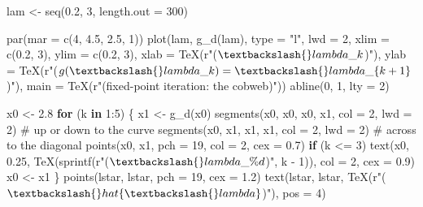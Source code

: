 \documentclass[
  letterpaper,
  DIV=11,
  numbers=noendperiod]{scrreprt}
\newenvironment{Shaded}{\begin{snugshade}}{\end{snugshade}}
\newcommand{\AttributeTok}[1]{\textcolor[rgb]{0.40,0.45,0.13}{#1}}
\newcommand{\CommentTok}[1]{\textcolor[rgb]{0.37,0.37,0.37}{#1}}
\newcommand{\ControlFlowTok}[1]{\textcolor[rgb]{0.00,0.23,0.31}{\textbf{#1}}}
\newcommand{\DecValTok}[1]{\textcolor[rgb]{0.68,0.00,0.00}{#1}}
\newcommand{\FloatTok}[1]{\textcolor[rgb]{0.68,0.00,0.00}{#1}}
\newcommand{\FunctionTok}[1]{\textcolor[rgb]{0.28,0.35,0.67}{#1}}
\newcommand{\NormalTok}[1]{\textcolor[rgb]{0.00,0.23,0.31}{#1}}
\newcommand{\OtherTok}[1]{\textcolor[rgb]{0.00,0.23,0.31}{#1}}
\newcommand{\SpecialCharTok}[1]{\textcolor[rgb]{0.37,0.37,0.37}{#1}}
\newcommand{\StringTok}[1]{\textcolor[rgb]{0.13,0.47,0.30}{#1}}
\begin{document}
\begin{Shaded}
\begin{Highlighting}[]
\NormalTok{lam }\OtherTok{\textless{}{-}} \FunctionTok{seq}\NormalTok{(}\FloatTok{0.2}\NormalTok{, }\DecValTok{3}\NormalTok{, }\AttributeTok{length.out =} \DecValTok{300}\NormalTok{)}

\FunctionTok{par}\NormalTok{(}\AttributeTok{mar =} \FunctionTok{c}\NormalTok{(}\DecValTok{4}\NormalTok{, }\FloatTok{4.5}\NormalTok{, }\FloatTok{2.5}\NormalTok{, }\DecValTok{1}\NormalTok{))}
\FunctionTok{plot}\NormalTok{(lam, }\FunctionTok{g\_d}\NormalTok{(lam), }\AttributeTok{type =} \StringTok{"l"}\NormalTok{, }\AttributeTok{lwd =} \DecValTok{2}\NormalTok{, }\AttributeTok{xlim =} \FunctionTok{c}\NormalTok{(}\FloatTok{0.2}\NormalTok{, }\DecValTok{3}\NormalTok{), }\AttributeTok{ylim =} \FunctionTok{c}\NormalTok{(}\FloatTok{0.2}\NormalTok{, }\DecValTok{3}\NormalTok{),}
     \AttributeTok{xlab =} \FunctionTok{TeX}\NormalTok{(r}\StringTok{"($\textbackslash{}lambda\_k$)"}\NormalTok{), }\AttributeTok{ylab =} \FunctionTok{TeX}\NormalTok{(r}\StringTok{"($g(\textbackslash{}lambda\_k) = \textbackslash{}lambda\_\{k+1\}$)"}\NormalTok{),}
     \AttributeTok{main =} \FunctionTok{TeX}\NormalTok{(r}\StringTok{"(fixed{-}point iteration: the cobweb)"}\NormalTok{))}
\FunctionTok{abline}\NormalTok{(}\DecValTok{0}\NormalTok{, }\DecValTok{1}\NormalTok{, }\AttributeTok{lty =} \DecValTok{2}\NormalTok{)}

\NormalTok{x0 }\OtherTok{\textless{}{-}} \FloatTok{2.8}
\ControlFlowTok{for}\NormalTok{ (k }\ControlFlowTok{in} \DecValTok{1}\SpecialCharTok{:}\DecValTok{5}\NormalTok{) \{}
\NormalTok{  x1 }\OtherTok{\textless{}{-}} \FunctionTok{g\_d}\NormalTok{(x0)}
  \FunctionTok{segments}\NormalTok{(x0, x0, x0, x1, }\AttributeTok{col =} \DecValTok{2}\NormalTok{, }\AttributeTok{lwd =} \DecValTok{2}\NormalTok{)          }\CommentTok{\# up or down to the curve}
  \FunctionTok{segments}\NormalTok{(x0, x1, x1, x1, }\AttributeTok{col =} \DecValTok{2}\NormalTok{, }\AttributeTok{lwd =} \DecValTok{2}\NormalTok{)          }\CommentTok{\# across to the diagonal}
  \FunctionTok{points}\NormalTok{(x0, x1, }\AttributeTok{pch =} \DecValTok{19}\NormalTok{, }\AttributeTok{col =} \DecValTok{2}\NormalTok{, }\AttributeTok{cex =} \FloatTok{0.7}\NormalTok{)}
  \ControlFlowTok{if}\NormalTok{ (k }\SpecialCharTok{\textless{}=} \DecValTok{3}\NormalTok{) }\FunctionTok{text}\NormalTok{(x0, }\FloatTok{0.25}\NormalTok{, }\FunctionTok{TeX}\NormalTok{(}\FunctionTok{sprintf}\NormalTok{(r}\StringTok{"($\textbackslash{}lambda\_\%d$)"}\NormalTok{, k }\SpecialCharTok{{-}} \DecValTok{1}\NormalTok{)), }\AttributeTok{col =} \DecValTok{2}\NormalTok{, }\AttributeTok{cex =} \FloatTok{0.9}\NormalTok{)}
\NormalTok{  x0 }\OtherTok{\textless{}{-}}\NormalTok{ x1}
\NormalTok{\}}
\FunctionTok{points}\NormalTok{(lstar, lstar, }\AttributeTok{pch =} \DecValTok{19}\NormalTok{, }\AttributeTok{cex =} \FloatTok{1.2}\NormalTok{)}
\FunctionTok{text}\NormalTok{(lstar, lstar, }\FunctionTok{TeX}\NormalTok{(r}\StringTok{"($\textbackslash{}hat\{\textbackslash{}lambda\}$)"}\NormalTok{), }\AttributeTok{pos =} \DecValTok{4}\NormalTok{)}
\end{Highlighting}
\end{Shaded}
\end{document}
